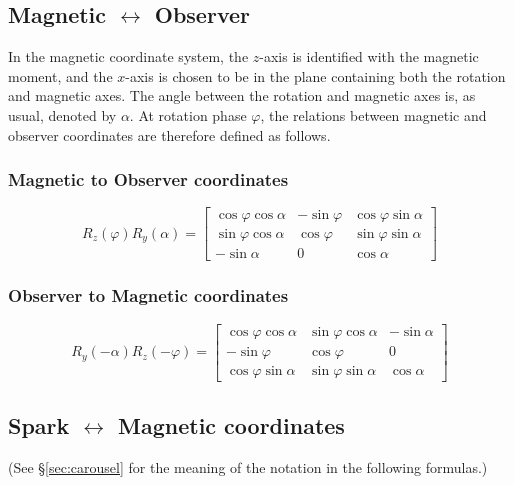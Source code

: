 \documentclass{article}
\newcommand{\phase}{\varphi}
\begin{document}
\subsection{Magnetic $\leftrightarrow$ Observer}

In the magnetic coordinate system, the $z$-axis is identified with the magnetic moment, and the $x$-axis is chosen to be in the plane containing both the rotation and magnetic axes.
The angle between the rotation and magnetic axes is, as usual, denoted by $\alpha$.
At rotation phase $\phase$, the relations between magnetic and observer coordinates are therefore defined as follows.

\subsubsection{Magnetic to Observer coordinates}
\begin{equation}
    R_z(\phase) R_y(\alpha) =
    \begin{bmatrix}
        \cos\phase\cos\alpha & -\sin\phase & \cos\phase\sin\alpha \\
        \sin\phase\cos\alpha &  \cos\phase & \sin\phase\sin\alpha \\
        -\sin\alpha          & 0           & \cos\alpha
    \end{bmatrix}
\end{equation}

\subsubsection{Observer to Magnetic coordinates}
\begin{equation}
    R_y(-\alpha) R_z(-\phase) =
    \begin{bmatrix}
        \cos\phase\cos\alpha & \sin\phase\cos\alpha & -\sin\alpha \\
        -\sin\phase          & \cos\phase           & 0           \\
        \cos\phase\sin\alpha & \sin\phase\sin\alpha &  \cos\alpha
    \end{bmatrix}
\end{equation}

\subsection{Spark $\leftrightarrow$ Magnetic coordinates}

(See \S\ref{sec:carousel} for the meaning of the notation in the following formulas.)
\end{document}
